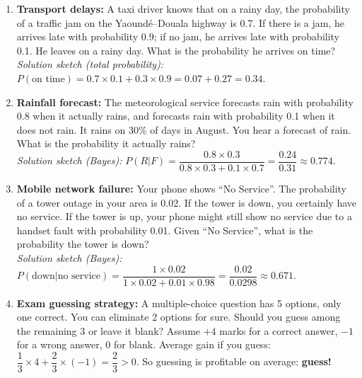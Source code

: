 \documentclass[11pt]{article}
\begin{document}
\begin{experience}
\begin{enumerate}
    \item \textbf{Transport delays:} A taxi driver knows that on a rainy day, the probability of a traffic jam on the Yaound\'e--Douala highway is 0.7. If there is a jam, he arrives late with probability 0.9; if no jam, he arrives late with probability 0.1. He leaves on a rainy day. What is the probability he arrives on time?\\
    \emph{Solution sketch (total probability):} $P(\text{on time}) = 0.7\times 0.1 + 0.3\times 0.9 = 0.07 + 0.27 = 0.34$.
    \item \textbf{Rainfall forecast:} The meteorological service forecasts rain with probability 0.8 when it actually rains, and forecasts rain with probability 0.1 when it does not rain. It rains on 30\% of days in August. You hear a forecast of rain. What is the probability it actually rains?\\
    \emph{Solution sketch (Bayes):} $P(R|F) = \dfrac{0.8\times 0.3}{0.8\times 0.3 + 0.1\times 0.7} = \dfrac{0.24}{0.31} \approx 0.774$.
    \item \textbf{Mobile network failure:} Your phone shows ``No Service''. The probability of a tower outage in your area is 0.02. If the tower is down, you certainly have no service. If the tower is up, your phone might still show no service due to a handset fault with probability 0.01. Given ``No Service'', what is the probability the tower is down?\\
    \emph{Solution sketch (Bayes):} $P(\text{down}|\text{no service}) = \dfrac{1\times 0.02}{1\times 0.02 + 0.01\times 0.98} = \dfrac{0.02}{0.0298} \approx 0.671$.
    \item \textbf{Exam guessing strategy:} A multiple-choice question has 5 options, only one correct. You can eliminate 2 options for sure. Should you guess among the remaining 3 or leave it blank? Assume $+4$ marks for a correct answer, $-1$ for a wrong answer, $0$ for blank. Average gain if you guess: $\dfrac{1}{3}\times 4 + \dfrac{2}{3}\times(-1) = \dfrac{2}{3} > 0$. So guessing is profitable on average: \textbf{guess!}
\end{enumerate}
\end{experience}
\end{document}
